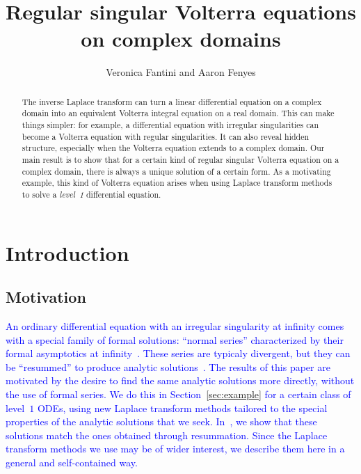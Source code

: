 \documentclass[review]{siamart220329}
\title{Regular singular Volterra equations on complex domains}
\author{Veronica Fantini and Aaron Fenyes}
\date{}
\begin{document}
\maketitle

\begin{abstract}
The inverse Laplace transform can turn a linear differential equation on a complex domain into an equivalent Volterra integral equation on a real domain. This can make things simpler: for example, a differential equation with irregular singularities can become a Volterra equation with regular singularities. It can also reveal hidden structure, especially when the Volterra equation extends to a complex domain. Our main result is to show that for a certain kind of regular singular Volterra equation on a complex domain, there is always a unique solution of a certain form. As a motivating example, this kind of Volterra equation arises when using Laplace transform methods to solve a {\em level~1} differential equation.
\end{abstract}
\tableofcontents
\section{Introduction}\label{sec:intro}
\subsection{Motivation}\label{sec:motivation}
\color{blue}
\textcolor{blue}{An ordinary differential equation with an irregular singularity at infinity comes with a special family of formal solutions: ``normal series'' characterized by their formal asymptotics at infinity~\cite{int-irreg}. These series are typicaly divergent, but they can be ``resummed'' to produce analytic solutions~\cite{loday1994stokes,diverg-resurg--ii,loday-Remy2011,malgrange1995sommation,ramis1991series}. The results of this paper are motivated by the desire to find the same analytic solutions more directly, without the use of formal series. We do this in Section~\ref{sec:example} for a certain class of level~$1$ ODEs, using new Laplace transform methods tailored to the special properties of the analytic solutions that we seek. In~\cite{borel_reg}, we show that these solutions match the ones obtained through resummation. Since the Laplace transform methods we use may be of wider interest, we describe them here in a general and self-contained way.}
\end{document}
